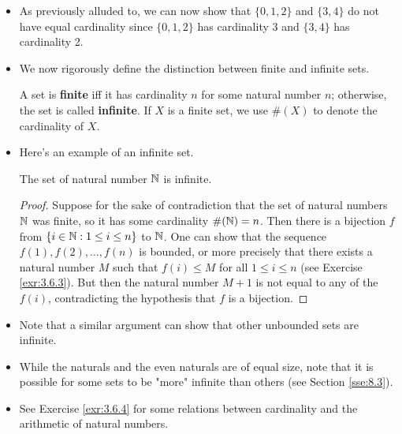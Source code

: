 \documentclass[../main.tex]{subfiles}
\begin{document}
\begin{itemize}
\begin{proof}[Proof of Proposition \ref{prp:cardinalityUniqueness}]
    \end{proof}
    \item {}As previously alluded to, we can now show that $\{0,1,2\}$ and $\{3,4\}$ do not have equal cardinality since $\{0,1,2\}$ has cardinality 3 and $\{3,4\}$ has cardinality 2.
    \item We now rigorously define the distinction between finite and infinite sets.
    \begin{dfn}\label{dfn:finiteInfinte}
        A set is \textbf{finite} iff it has cardinality $n$ for some natural number $n$; otherwise, the set is called \textbf{infinite}. If $X$ is a finite set, we use $\#(X)$ to denote the cardinality of $X$.
    \end{dfn}
    \item Here's an example of an infinite set.
    \begin{trm}
        The set of natural number $\mathbb{N}$ is infinite.
        \begin{proof}
            Suppose for the sake of contradiction that the set of natural numbers $\mathbb{N}$ was finite, so it has some cardinality $\#(\mathbb{N})=n$. Then there is a bijection $f$ from $\{i\in\mathbb{N}:1\leq i\leq n\}$ to $\mathbb{N}$. One can show that the sequence $f(1),f(2),\dots,f(n)$ is bounded, or more precisely that there exists a natural number $M$ such that $f(i)\leq M$ for all $1\leq i\leq n$ (see Exercise \ref{exr:3.6.3}). But then the natural number $M+1$ is not equal to any of the $f(i)$, contradicting the hypothesis that $f$ is a bijection.
        \end{proof}
    \end{trm}
    \item Note that a similar argument can show that other unbounded sets are infinite.
    \item While the naturals and the even naturals are of equal size, note that it is possible for some sets to be "more" infinite than others (see Section \ref{sse:8.3}).
    \item See Exercise \ref{exr:3.6.4} for some relations between cardinality and the arithmetic of natural numbers.
\end{itemize}
\end{document}

